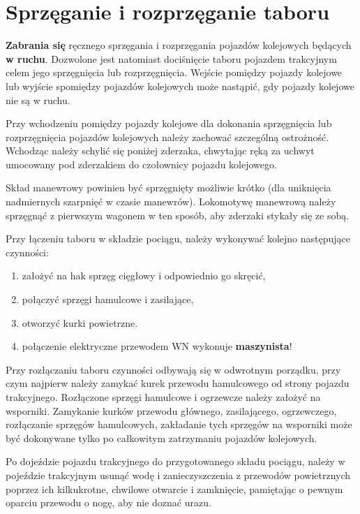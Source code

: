 \chapter{Sprzęganie i rozprzęganie taboru}

\textbf{Zabrania się} ręcznego sprzęgania i rozprzęgania pojazdów kolejowych będących \textbf{w ruchu}. Dozwolone jest natomiast dociśnięcie taboru pojazdem trakcyjnym celem jego sprzęgnięcia lub rozprzęgnięcia. Wejście pomiędzy pojazdy kolejowe lub wyjście spomiędzy pojazdów kolejowych może nastąpić, gdy pojazdy kolejowe nie są w ruchu. 

Przy wchodzeniu pomiędzy pojazdy kolejowe dla dokonania sprzęgnięcia lub rozprzęgnięcia pojazdów kolejowych należy zachować szczególną ostrożność. Wchodząc należy schylić się poniżej zderzaka, chwytając ręką za uchwyt umocowany pod zderzakiem do czołownicy pojazdu kolejowego. 

Skład manewrowy powinien być sprzęgnięty możliwie krótko (dla uniknięcia nadmiernych szarpnięć w czasie manewrów). Lokomotywę manewrową należy sprzęgnąć z pierwszym wagonem w ten sposób, aby zderzaki stykały się ze sobą. 

Przy łączeniu taboru w składzie pociągu, należy wykonywać kolejno następujące czynności: 

\begin{enumerate}
	\item założyć na hak sprzęg cięgłowy i odpowiednio go skręcić, 
	\item połączyć sprzęgi hamulcowe i zasilające, 
	\item otworzyć kurki powietrzne.
	\item połączenie elektryczne przewodem WN wykonuje \textbf{maszynista}!
\end{enumerate}
Przy rozłączaniu taboru czynności odbywają się w odwrotnym porządku, przy czym najpierw należy zamykać kurek przewodu hamulcowego od strony pojazdu trakcyjnego. Rozłączone sprzęgi hamulcowe i ogrzewcze należy założyć na wsporniki. Zamykanie kurków przewodu głównego, zasilającego, ogrzewczego, rozłączanie sprzęgów hamulcowych, zakładanie tych sprzęgów na wsporniki może być dokonywane tylko po całkowitym zatrzymaniu pojazdów kolejowych. 

Po dojeździe pojazdu trakcyjnego do przygotowanego składu pociągu, należy w pojeździe trakcyjnym usunąć wodę i zanieczyszczenia z przewodów powietrznych poprzez ich kilkukrotne, chwilowe otwarcie i zamknięcie, pamiętając o pewnym oparciu przewodu o nogę, aby nie doznać urazu.

